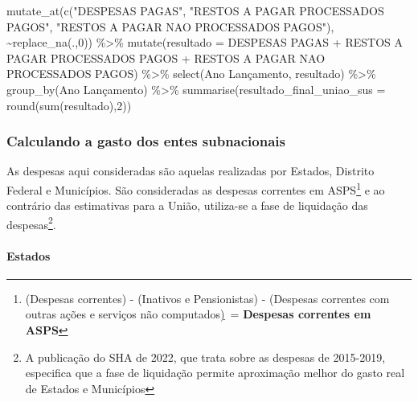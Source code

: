 \documentclass[
  letterpaper,
  DIV=11,
  numbers=noendperiod]{scrartcl}
\let\oldparagraph\paragraph
\renewcommand{\paragraph}[1]{\oldparagraph{#1}\mbox{}}
\newenvironment{Shaded}{\begin{snugshade}}{\end{snugshade}}
\newcommand{\AttributeTok}[1]{\textcolor[rgb]{0.40,0.45,0.13}{#1}}
\newcommand{\DecValTok}[1]{\textcolor[rgb]{0.68,0.00,0.00}{#1}}
\newcommand{\FunctionTok}[1]{\textcolor[rgb]{0.28,0.35,0.67}{#1}}
\newcommand{\NormalTok}[1]{\textcolor[rgb]{0.00,0.23,0.31}{#1}}
\newcommand{\SpecialCharTok}[1]{\textcolor[rgb]{0.37,0.37,0.37}{#1}}
\newcommand{\StringTok}[1]{\textcolor[rgb]{0.13,0.47,0.30}{#1}}
\begin{document}
\begin{Shaded}
\begin{Highlighting}[]
  \FunctionTok{mutate\_at}\NormalTok{(}\FunctionTok{c}\NormalTok{(}\StringTok{"DESPESAS PAGAS"}\NormalTok{, }\StringTok{"RESTOS A PAGAR PROCESSADOS PAGOS"}\NormalTok{, }\StringTok{"RESTOS A PAGAR NAO PROCESSADOS PAGOS"}\NormalTok{), }\SpecialCharTok{\textasciitilde{}}\FunctionTok{replace\_na}\NormalTok{(.,}\DecValTok{0}\NormalTok{)) }\SpecialCharTok{\%\textgreater{}\%}
  \FunctionTok{mutate}\NormalTok{(}\AttributeTok{resultado =} \StringTok{\textasciigrave{}}\AttributeTok{DESPESAS PAGAS}\StringTok{\textasciigrave{}} \SpecialCharTok{+} \StringTok{\textasciigrave{}}\AttributeTok{RESTOS A PAGAR PROCESSADOS PAGOS}\StringTok{\textasciigrave{}} \SpecialCharTok{+} \StringTok{\textasciigrave{}}\AttributeTok{RESTOS A PAGAR NAO PROCESSADOS PAGOS}\StringTok{\textasciigrave{}}\NormalTok{) }\SpecialCharTok{\%\textgreater{}\%}
  \FunctionTok{select}\NormalTok{(}\StringTok{\textasciigrave{}}\AttributeTok{Ano Lançamento}\StringTok{\textasciigrave{}}\NormalTok{, resultado) }\SpecialCharTok{\%\textgreater{}\%}
  \FunctionTok{group\_by}\NormalTok{(}\StringTok{\textasciigrave{}}\AttributeTok{Ano Lançamento}\StringTok{\textasciigrave{}}\NormalTok{) }\SpecialCharTok{\%\textgreater{}\%}
  \FunctionTok{summarise}\NormalTok{(}\AttributeTok{resultado\_final\_uniao\_sus =} \FunctionTok{round}\NormalTok{(}\FunctionTok{sum}\NormalTok{(resultado),}\DecValTok{2}\NormalTok{))}
\end{Highlighting}
\end{Shaded}

\hypertarget{calculando-a-gasto-dos-entes-subnacionais}{%
\subsubsection{Calculando a gasto dos entes
subnacionais}\label{calculando-a-gasto-dos-entes-subnacionais}}

As despesas aqui consideradas são aquelas realizadas por Estados,
Distrito Federal e Municípios. São consideradas as despesas correntes em
ASPS\footnote{(Despesas correntes) - (Inativos e Pensionistas) -
  (Despesas correntes com outras ações e serviços não
  computados\uline{)}~= \textbf{Despesas correntes em ASPS}} e ao
contrário das estimativas para a União, utiliza-se a fase de liquidação
das despesas\footnote{A publicação do SHA de 2022, que trata sobre as
  despesas de 2015-2019, especifica que a fase de liquidação permite
  aproximação melhor do gasto real de Estados e Municípios}.

\hypertarget{estados}{%
\paragraph{Estados}\label{estados}}
\end{document}
